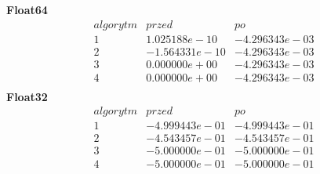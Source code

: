 \textbf{Float64}
$$
\begin{array}{c|c|c}
algorytm & przed & po\\
\hline
1 &    1.025188e-10 &   -4.296343e-03 \\
2 &   -1.564331e-10 &   -4.296343e-03 \\
3 &    0.000000e+00 &   -4.296343e-03 \\
4 &    0.000000e+00 &   -4.296343e-03 \\
\end{array}
$$
\textbf{Float32}
$$
\begin{array}{c|c|c}
algorytm & przed & po\\
\hline
1 &   -4.999443e-01 &   -4.999443e-01 \\
2 &   -4.543457e-01 &   -4.543457e-01 \\
3 &   -5.000000e-01 &   -5.000000e-01 \\
4 &   -5.000000e-01 &   -5.000000e-01 \\
\end{array}
$$
